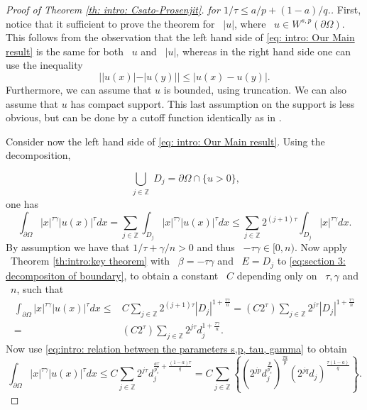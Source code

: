 \documentclass[reqno,12pt]{amsart}
\numberwithin{equation}{section}
\theoremstyle{plain}
\theoremstyle{definition}
\renewcommand{\leq}{\leqslant}
\begin{document}
\begin{proof}[Proof of Theorem \ref{th: intro: Csato-Prosenjit}. for $1/\tau\leq a/p+(1-a)/q$.]  First, notice that it sufficient to prove the theorem for ~$|u|$, where ~$u\in W^{s,p}(\partial\Omega).$
This follows from the observation that the  left hand side of \eqref{eq: intro: Our Main result} is the same for both ~$u$ and ~$|u|$, whereas in the right hand side one can use the inequality
$$
  ||u(x)|-|u(y)|| \leq |u(x)-u(y)|.
$$
Furthermore, we can assume that $u$ is bounded, using truncation. We can also assume that $u$ has compact support. This last assumption on the support is less obvious, but can be done by a cutoff function identically as in \cite[Section 4, Proof of Theorem 1.3]{Cabre-Cozzi-Csato}. 

 Consider now the left hand side of \eqref{eq: intro: Our Main result}. Using the decomposition,

$$
\bigcup_{\substack{ j\in \mathbb{Z}}}D_j= \partial \Omega\cap\{u>0\}, 
$$
one has 
\begin{equation}
    \label{eq:section 3: decompositon of boundary}
    \int_{\partial \Omega} |x|^{\tau\gamma}|u(x)|^{\tau}dx 
    = \sum_{j \in\mathbb{Z} } \int_{D_j}|x|^{\tau\gamma}|u(x)|^{\tau}dx
    \leq  \sum_{j \in\mathbb{Z} } 2^{(j+1)\tau}\int_{D_j}|x|^{\tau\gamma}dx.
\end{equation}
By assumption we have that $1/\tau+\gamma/n>0$ and thus ~$-\tau\gamma \in [0,n)$. Now  apply ~Theorem \ref{th:intro:key theorem} with ~$\beta = -\tau\gamma$ and ~$E=D_j$ to \eqref{eq:section 3: decompositon of boundary}, to obtain a constant ~$C$ depending only on ~$\tau, \gamma$ and ~$n$, such that
\begin{align*}
    \label{section 3: decompositon of boundary and lemma applied}
    \int_{\partial \Omega} |x|^{\tau\gamma}|u(x)|^{\tau}dx  
    \leq & C \sum_{j \in\mathbb{Z} } 2^{(j+1)\tau}|D_j|^{1+\frac{\tau\gamma}{n}} = (C2^\tau) \sum_{j \in\mathbb{Z} } 2^{j\tau}|D_j|^{1+\frac{\tau\gamma}{n}} \\
    = &(C2^\tau) \sum_{j \in\mathbb{Z} } 2^{j\tau}d_j^{1+\frac{\tau\gamma}{n}} .
\end{align*}
Now use \eqref{eq:intro: relation between the parameters s,p, tau, gamma} to obtain 
\begin{equation}
    \label{eq: sec3: estimates}
      \int_{\partial \Omega} |x|^{\tau\gamma}|u(x)|^{\tau}dx 
      \leq  C \sum_{j \in\mathbb{Z} } 2^{j\tau}d_j^{\frac{a\tau}{p_s^{*}} + \frac{(1-a)\tau}{q}}
      = C \sum_{j \in\mathbb{Z} } \left\{ \left(2^{jp}d_j^{\frac{p}{p_s^*}}\right)^{\frac{\tau a}{p}} \left(2^{jq}d_j\right)^{\frac{\tau (1-a)}{q}} \right\}.
\end{equation} 


\end{proof}
\end{document}
